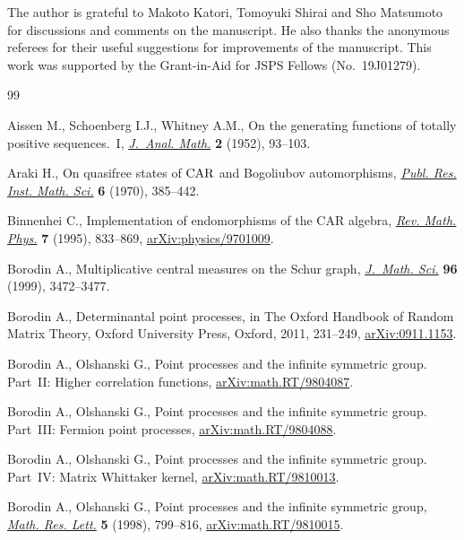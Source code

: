 \documentclass[pdftex]{sigma}
\numberwithin{equation}{section}
\begin{document}
The author is grateful to Makoto Katori, Tomoyuki Shirai and Sho Matsumoto for discussions and comments on the manuscript.
He also thanks the anonymous referees for their useful suggestions for improvements of the manuscript.
This work was supported by the Grant-in-Aid for JSPS Fellows (No.~19J01279).

\begin{thebibliography}{99}
\footnotesize\itemsep=0pt

Aissen M., Schoenberg I.J., Whitney A.M., On the generating functions of
 totally positive sequences.~{I}, \href{https://doi.org/10.1007/BF02786970}{\textit{J.~Anal. Math.}} \textbf{2} (1952),
 93--103.

Araki H., On quasifree states of {${\rm CAR}$} and {B}ogoliubov automorphisms,
 \href{https://doi.org/10.2977/prims/1195193913}{\textit{Publ. Res. Inst. Math. Sci.}} \textbf{6} (1970), 385--442.

Binnenhei C., Implementation of endomorphisms of the {CAR} algebra,
 \href{https://doi.org/10.1142/S0129055X95000323}{\textit{Rev. Math. Phys.}} \textbf{7} (1995), 833--869,
 \href{https://arxiv.org/abs/physics/9701009}{arXiv:physics/9701009}.

Borodin A., Multiplicative central measures on the {S}chur graph,
 \href{https://doi.org/10.1007/BF02175824}{\textit{J.~Math. Sci.}} \textbf{96} (1999), 3472--3477.

Borodin A., Determinantal point processes, in The {O}xford Handbook of Random
 Matrix Theory, Oxford University Press, Oxford, 2011, 231--249,
 \href{https://arxiv.org/abs/0911.1153}{arXiv:0911.1153}.

Borodin A., Olshanski G., Point processes and the infinite symmetric group.
 Part~II: Higher correlation functions, \href{https://arxiv.org/abs/math.RT/9804087}{arXiv:math.RT/9804087}.

Borodin A., Olshanski G., Point processes and the infinite symmetric group.
 Part~III: Fermion point processes, \href{https://arxiv.org/abs/math.RT/9804088}{arXiv:math.RT/9804088}.

Borodin A., Olshanski G., Point processes and the infinite symmetric group.
 Part~IV: Matrix Whittaker kernel, \href{https://arxiv.org/abs/math.RT/9810013}{arXiv:math.RT/9810013}.

Borodin A., Olshanski G., Point processes and the infinite symmetric group,
 \href{https://doi.org/10.4310/MRL.1998.v5.n6.a9}{\textit{Math. Res. Lett.}} \textbf{5} (1998), 799--816,
 \href{https://arxiv.org/abs/math.RT/9810015}{arXiv:math.RT/9810015}.


\end{thebibliography}
\end{document}
